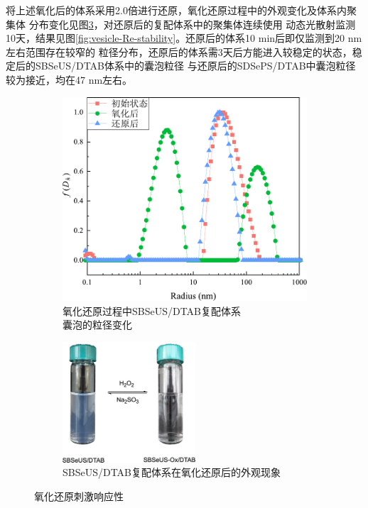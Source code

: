 \documentclass[bachelor,winfonts,replaceperiod]{jnuthesis}
\begin{document}
    将上述氧化后的体系采用2.0倍进行还原，氧化还原过程中的外观变化及体系内聚集体
    分布变化见图\ref{fig:SBSeUS/DTAB氧化还原刺激响应性}，对还原后的复配体系中的聚集体连续使用
    动态光散射监测10天，结果见图\ref{fig:vesicle-Re-stability}。还原后的体系10 min后即仅监测到20 nm左右范围存在较窄的
    粒径分布，还原后的体系需3天后方能进入较稳定的状态，稳定后的SBSeUS/DTAB体系中的囊泡粒径
    与还原后的SDSePS/DTAB中囊泡粒径较为接近，均在47 nm左右。
    \begin{figure}[htbp]
        \begin{subfigure}[]{.5\textwidth}
            \centering
            \includegraphics[width=.8\textwidth]{figure/SBSeUS-redox-radius.pdf}
            \caption{氧化还原过程中SBSeUS/DTAB复配体系\\囊泡的粒径变化}\label{fig:SBSeUS-redox-radius}
        \end{subfigure}%
        \begin{subfigure}[]{.5\textwidth}
            \centering
            \includegraphics[height=4.5cm]{figure/scheme-SBSeUS-redox.png}
            \caption{SBSeUS/DTAB复配体系在氧化还原后的外观现象}\label{fig:scheme-SBSeUS-redox}
        \end{subfigure}%
        \caption{氧化还原刺激响应性}
        \label{fig:SBSeUS/DTAB氧化还原刺激响应性}
    \end{figure}
    
\end{document}
